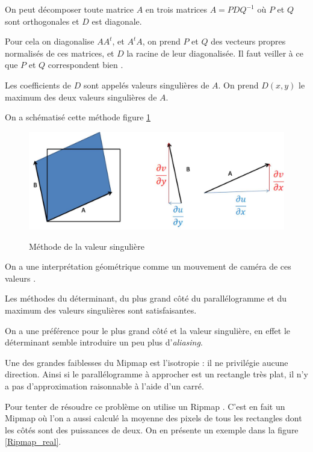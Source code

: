 On peut décomposer toute matrice $A$ en trois matrices $A = PDQ^{-1}$ où $P$ et $Q$ sont orthogonales et $D$ est diagonale.

Pour cela on diagonalise $AA^t$, et $A^tA$, on prend $P$ et $Q$ des vecteurs propres normalisés de ces matrices, et $D$ la racine de leur diagonalisée. Il faut veiller à ce que $P$ et $Q$ correspondent bien \cite{abdi2007singular}.

Les coefficients de $D$ sont appelés valeurs singulières de $A$. On prend $D(x,y)$ le maximum des deux valeurs singulières de $A$.

On a schématisé cette méthode figure \ref{methode_valeur_singuliere} 


\begin{figure}[h!]
\centering
\caption{Méthode de la valeur singulière}
\includegraphics[scale=0.5]{methode_valeur_singuliere.jpg}
\label{methode_valeur_singuliere}
\end{figure}

On a une interprétation géométrique comme un mouvement de caméra de ces valeurs \cite{morel2009asift}.


Les méthodes du déterminant, du plus grand côté du parallélogramme et du maximum des valeurs singulières sont satisfaisantes.

On a une préférence pour le plus grand côté et la valeur singulière, en effet le déterminant semble introduire un peu plus d'\emph{aliasing}.


Une des grandes faiblesses du Mipmap est l'isotropie : il ne privilégie aucune direction. Ainsi si le parallélogramme à approcher est un rectangle très plat, il n'y a pas d'approximation raisonnable à l'aide d'un carré.

Pour tenter de résoudre ce problème on utilise un Ripmap \cite{akenine2008real}. C'est en fait un Mipmap où l'on a aussi calculé la moyenne des pixels de tous les rectangles dont les côtés sont des puissances de deux. On en présente un exemple dans la figure \ref{Ripmap_real}.

